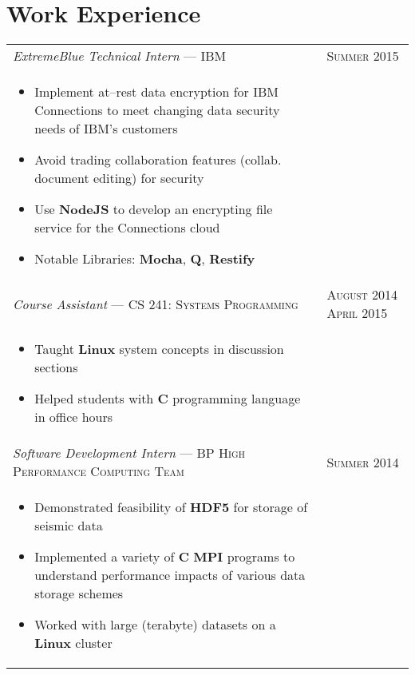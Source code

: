 \documentclass[letterpaper,10pt]{article}
\begin{document}
\section{Work Experience}
\begin{tabular}{p{13.5cm}>{\raggedleft\arraybackslash}p{2.5cm}}

    \emph{ExtremeBlue Technical Intern} --- \textsc{IBM} & \textsc{Summer 2015} \\

    \vspace{-2mm}
    \begin{itemize}
        \item
            Implement at--rest data encryption for IBM Connections to meet
            changing data security needs of IBM's customers
        \item
            Avoid trading collaboration features (collab. document editing) for
            security
        \item
            Use \textbf{NodeJS} to develop an encrypting file service for the
            Connections cloud
        \item
            Notable Libraries: \textbf{Mocha}, \textbf{Q}, \textbf{Restify}
    \end{itemize} \\

    \emph{Course Assistant} --- \textsc{CS 241: Systems Programming} &
    \textsc{August 2014 April 2015} \\

    \vspace{-6mm}
    \begin{itemize}
        \item
            Taught \textbf{Linux} system concepts in discussion sections
        \item
            Helped students with \textbf{C} programming language in office hours
    \end{itemize} \\

    \emph{Software Development Intern} --- \textsc{BP High Performance Computing Team} &
    \textsc{Summer 2014} \\

    \vspace{-2mm}
    \begin{itemize}
        \item
            Demonstrated feasibility of \textbf{HDF5} for storage of seismic
            data
        \item
            Implemented a variety of \textbf{C} \textbf{MPI} programs to
            understand performance impacts of various data storage schemes
        \item
            Worked with large (terabyte) datasets on a \textbf{Linux} cluster


\end{itemize}
\end{tabular}
\end{document}
